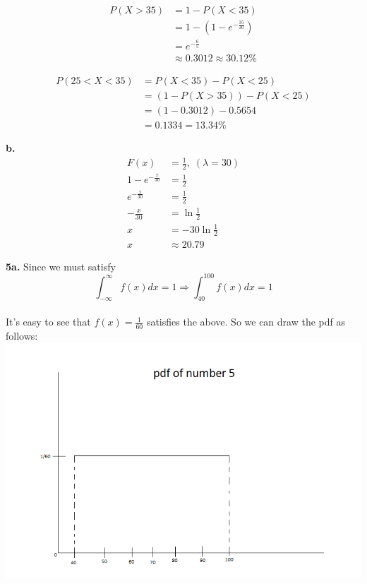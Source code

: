 \documentclass[12pt]{report}
\begin{document}
\begin{align*}
P(X > 35) &= 1 - P(X < 35)\\
&= 1 - \left(1 - e^{-\frac{35}{30}}\right)\\
&= e^{-\frac{6}{5}}\\
&\approx \boxed{0.3012 \approx 30.12\%}
\end{align*}

\begin{align*}
P(25 < X < 35) &= P(X < 35) - P(X < 25)\\
&= (1-P(X > 35)) - P(X < 25)\\
&= (1 - 0.3012)-0.5654\\
&= \boxed{0.1334 = 13.34\%}
\end{align*}

\noindent \textbf{b.}
\begin{align*}
F(x) &= \frac{1}{2}, \; (\lambda = 30)\\
1-e^{-\frac{x}{30}} &= \frac{1}{2}\\
e^{-\frac{x}{30}} &= \frac{1}{2} \\
-\frac{x}{30} &= \ln{\frac{1}{2}}\\
x &= -30\ln{\frac{1}{2}}\\
x &\approx \boxed{20.79}
\end{align*}

\pagebreak

\noindent \textbf{5a.} Since we must satisfy \\

$$ \int_{-\infty}^{\infty} f(x)dx = 1 \Rightarrow \int_{40}^{100}f(x)dx = 1$$\\
\noindent It's easy to see that $f(x) = \frac{1}{60}$ satisfies the above. So we can draw the pdf as follows:\\

\includegraphics[scale=.7]{hw3_5}
\end{document}
